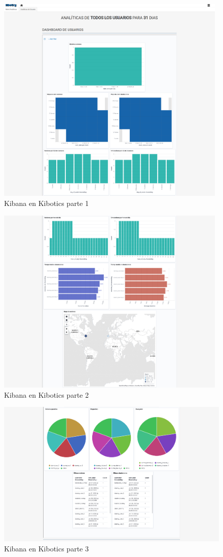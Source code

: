 \documentclass[a4paper, 12pt]{book}
\begin{document}
		\begin{figure}[H]
			\centering
			\includegraphics[width=11cm, keepaspectratio]{img/kibana_kibotics_01.png}
			\caption{Kibana en Kibotics parte 1}
			\label{fig:kibana_kibotics_01}
		\end{figure}
		\begin{figure}[H]
			\centering
			\includegraphics[width=11cm, keepaspectratio]{img/kibana_kibotics_02.png}
			\caption{Kibana en Kibotics parte 2}
			\label{fig:kibana_kibotics_02}
		\end{figure}
		\begin{figure}[H]
			\centering
			\includegraphics[width=12cm, keepaspectratio]{img/kibana_kibotics_03.png}
			\caption{Kibana en Kibotics parte 3}
			\label{fig:kibana_kibotics_03}
		\end{figure}
\end{document}
